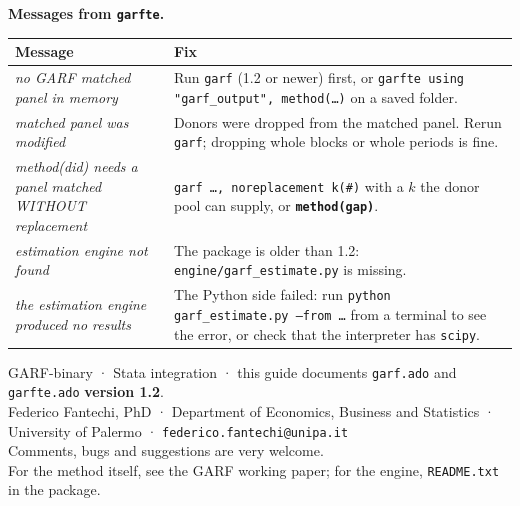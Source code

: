 \documentclass[11pt,a4paper]{article}
\newcommand{\opt}[1]{\texttt{\textbf{#1}}}
\newcommand{\code}[1]{\texttt{#1}}
\begin{document}
\medskip
\noindent\textbf{Messages from \code{garfte}.}\par
\begin{tabularx}{\textwidth}{@{}>{\raggedright\arraybackslash}p{}X@{}}
\toprule
Message & Fix\\
\midrule
\emph{no GARF matched panel in memory} & Run \code{garf} (1.2 or newer) first, or \code{garfte using "garf\_output", method(\dots)} on a saved folder.\\
\emph{matched panel was modified} & Donors were dropped from the matched panel. Rerun \code{garf}; dropping whole blocks or whole periods is fine.\\
\emph{method(did) needs a panel matched WITHOUT replacement} & \code{garf \dots, noreplacement k(\#)} with a $k$ the donor pool can supply, or \opt{method(gap)}.\\
\emph{estimation engine not found} & The package is older than 1.2: \code{engine/garf\_estimate.py} is missing.\\
\emph{the estimation engine produced no results} & The Python side failed: run \code{python garf\_estimate.py --from \dots} from a terminal to see the error, or check that the interpreter has \code{scipy}.\\
\bottomrule
\end{tabularx}

\vfill
\begin{center}\small\color{cmt}
GARF-binary · Stata integration · this guide documents \code{garf.ado} and \code{garfte.ado} \textbf{version 1.2}.\\
Federico Fantechi, PhD · Department of Economics, Business and Statistics · University of Palermo · \texttt{federico.fantechi@unipa.it}\\
Comments, bugs and suggestions are very welcome.\\
For the method itself, see the GARF working paper; for the engine, \code{README.txt} in the package.
\end{center}
\end{document}

